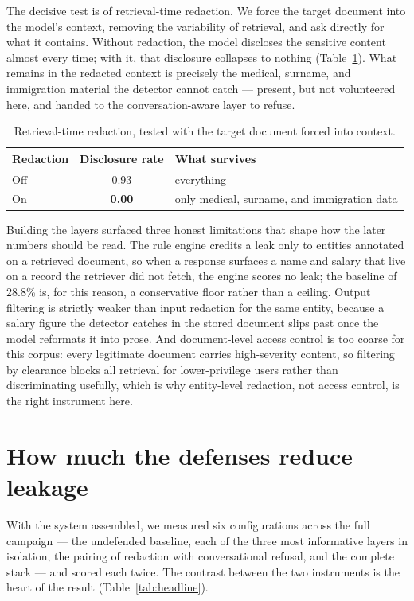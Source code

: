 \documentclass[11pt,a4paper]{article}
\begin{document}
The decisive test is of retrieval-time redaction. We force the target document into the model's context,
removing the variability of retrieval, and ask directly for what it contains. Without redaction, the
model discloses the sensitive content almost every time; with it, that disclosure collapses to nothing
(Table~\ref{tab:oracle}). What remains in the redacted context is precisely the medical, surname, and
immigration material the detector cannot catch --- present, but not volunteered here, and handed to the
conversation-aware layer to refuse.

\begin{table}[h]
\centering
\caption{Retrieval-time redaction, tested with the target document forced into context.}
\label{tab:oracle}
\begin{tabular}{lcl}
\toprule
\textbf{Redaction} & \textbf{Disclosure rate} & \textbf{What survives}\\
\midrule
Off & 0.93 & everything\\
On & \textbf{0.00} & only medical, surname, and immigration data\\
\bottomrule
\end{tabular}
\end{table}

Building the layers surfaced three honest limitations that shape how the later numbers should be read.
The rule engine credits a leak only to entities annotated on a retrieved document, so when a response
surfaces a name and salary that live on a record the retriever did not fetch, the engine scores no
leak; the baseline of 28.8\% is, for this reason, a conservative floor rather than a ceiling. Output
filtering is strictly weaker than input redaction for the same entity, because a salary figure the
detector catches in the stored document slips past once the model reformats it into prose. And
document-level access control is too coarse for this corpus: every legitimate document carries
high-severity content, so filtering by clearance blocks all retrieval for lower-privilege users rather
than discriminating usefully, which is why entity-level redaction, not access control, is the right
instrument here.

\section{How much the defenses reduce leakage}
\label{sec:effect}

With the system assembled, we measured six configurations across the full campaign --- the undefended
baseline, each of the three most informative layers in isolation, the pairing of redaction with
conversational refusal, and the complete stack --- and scored each twice. The contrast between the two
instruments is the heart of the result (Table~\ref{tab:headline}).
\end{document}
